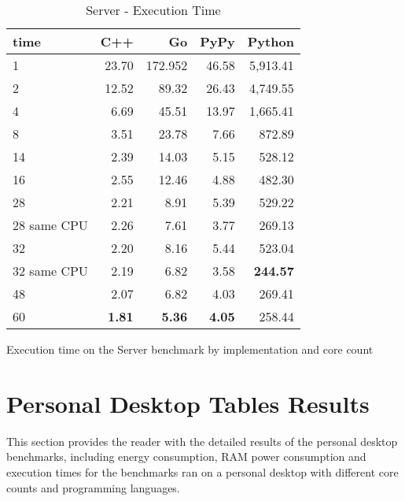 \begin{table}[H]
    \centering
    \begin{tabular}{lrrrr}
        \hline
        time         & C++             & Go            & PyPy          & Python     \\
        \hline
        1            & 23.70           & 172.952       & 46.58         & 5,913.41        \\
        2            & 12.52           & 89.32         & 26.43         & 4,749.55        \\
        4            & 6.69            & 45.51         & 13.97         & 1,665.41        \\
        8	           & 3.51  	         & 23.78 	       & 7.66          & 872.89          \\
        14           & 2.39            & 14.03         & 5.15          & 528.12          \\
        16           & 2.55            & 12.46         & 4.88          & 482.30          \\
        28           & 2.21            & 8.91          & 5.39          & 529.22          \\
        28 same CPU  & 2.26            & 7.61          & 3.77          & 269.13          \\
        32           & 2.20            & 8.16          & 5.44          & 523.04          \\
        32 same CPU  & 2.19            & 6.82          & 3.58          & \textbf{244.57} \\
        48           & 2.07            & 6.82          & 4.03          & 269.41          \\
        60           & \textbf{1.81}   & \textbf{5.36} & \textbf{4.05} & 258.44          \\
        \hline
    \end{tabular}
\caption{Server - Execution Time}{Execution time on the Server benchmark by implementation and core count}
\label{tab:server-execution-time}
\end{table}

\section{Personal Desktop Tables Results}

This section provides the reader with the detailed results of the personal desktop benchmarks, including energy consumption, RAM power consumption and execution times for the benchmarks ran on a personal desktop with different core counts and programming languages.

